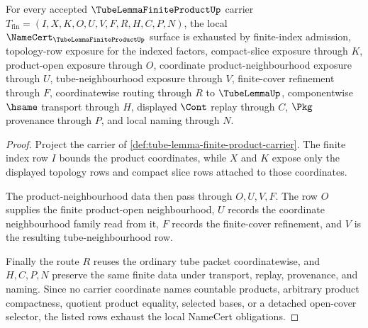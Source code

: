 \begin{theorem}
\label{thm:tube-lemma-finite-product-namecert-obligations}
For every accepted $\TubeLemmaFiniteProductUp$ carrier $T_{\mathrm{fin}}=(I,X,K,O,U,V,F,R,H,C,P,N)$, the local $\NameCert_{\TubeLemmaFiniteProductUp}$ surface is exhausted by finite-index admission, topology-row exposure for the indexed factors, compact-slice exposure through $K$, product-open exposure through $O$, coordinate product-neighbourhood exposure through $U$, tube-neighbourhood exposure through $V$, finite-cover refinement through $F$, coordinatewise routing through $R$ to $\TubeLemmaUp$, componentwise $\hsame$ transport through $H$, displayed $\Cont$ replay through $C$, $\Pkg$ provenance through $P$, and local naming through $N$.
\end{theorem}
\begin{proof}
Project the carrier of \autoref{def:tube-lemma-finite-product-carrier}. The finite index row $I$ bounds the product coordinates, while $X$ and $K$ expose only the displayed topology rows and compact slice rows attached to those coordinates.

The product-neighbourhood data then pass through $O,U,V,F$. The row $O$ supplies the finite product-open neighbourhood, $U$ records the coordinate neighbourhood family read from it, $F$ records the finite-cover refinement, and $V$ is the resulting tube-neighbourhood row.

Finally the route $R$ reuses the ordinary tube packet coordinatewise, and $H,C,P,N$ preserve the same finite data under transport, replay, provenance, and naming. Since no carrier coordinate names countable products, arbitrary product compactness, quotient product equality, selected bases, or a detached open-cover selector, the listed rows exhaust the local NameCert obligations.
\end{proof}

